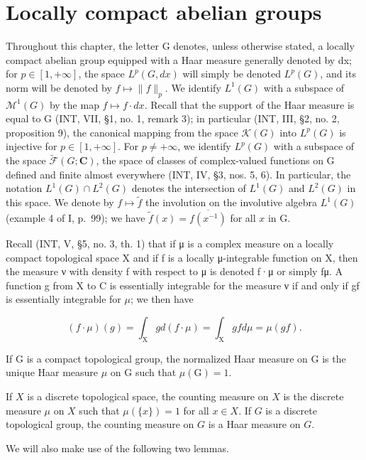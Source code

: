 \chapter{Locally compact abelian groups}

Throughout this chapter, the letter G denotes, unless otherwise stated, a locally compact abelian group equipped with a Haar measure generally denoted by dx; for \(p \in [1, +\infty]\), the space \(L^{p}(G, dx)\) will simply be denoted \(L^{p}(G)\), and its norm will be denoted by \(f \mapsto \|f\|_{p}\). We identify \(L^{1}(G)\) with a subspace of \(\mathcal{M}^{1}(G)\) by the map \(f \mapsto f \cdot dx\). Recall that the support of the Haar measure is equal to G (INT, VII, §1, no. 1, remark 3); in particular (INT, III, §2, no. 2, proposition 9), the canonical mapping from the space \(\mathcal{K}(G)\) into \(L^{p}(G)\) is injective for \(p \in [1, +\infty]\). For \(p \neq +\infty\), we identify \(L^{p}(G)\) with a subspace of the space \(\widetilde{\mathcal{F}}(G; \mathbf{C})\), the space of classes of complex-valued functions on G defined and finite almost everywhere (INT, IV, §3, nos. 5, 6). In particular, the notation \(L^{1}(G) \cap L^{2}(G)\) denotes the intersection of \(L^{1}(G)\) and \(L^{2}(G)\) in this space. We denote by \(f \mapsto \widetilde{f}\) the involution on the involutive algebra \(L^{1}(G)\) (example 4 of I, p.~99); we have \(\widetilde{f}(x) = \overline{f(x^{-1})}\) for all \(x\) in G.

Recall (INT, V, §5, no. 3, th. 1) that if μ is a complex measure on a locally compact topological space X and if f is a locally μ-integrable function on X, then the measure ν with density f with respect to μ is denoted f·μ or simply fμ. A function g from X to C is essentially integrable for the measure ν if and only if gf is essentially integrable for \(\mu\); we then have

\[
(f \cdot \mu) (g) = \int_ {\mathrm{X}} g d (f \cdot \mu) = \int_ {\mathrm{X}} g f d \mu = \mu (g f).
\]

If G is a compact topological group, the normalized Haar measure on G is the unique Haar measure \(\mu\) on G such that \(\mu(\mathrm{G}) = 1\).

If \(X\) is a discrete topological space, the counting measure on \(X\) is the discrete measure \(\mu\) on \(X\) such that \(\mu(\{x\}) = 1\) for all \(x \in X\). If \(G\) is a discrete topological group, the counting measure on \(G\) is a Haar measure on \(G\).

We will also make use of the following two lemmas.

